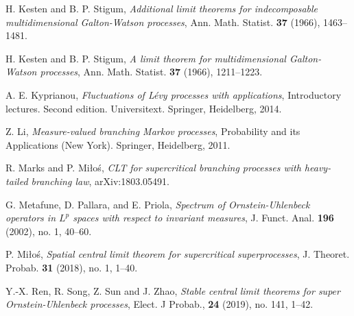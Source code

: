 \documentclass[12pt,a4paper]{amsart}
\theoremstyle{plain}
\theoremstyle{definition}
\numberwithin{equation}{section}
\begin{document}
\begin{thebibliography}{10}
  H. Kesten and B. P. Stigum,
  \emph{Additional limit theorems for indecomposable multidimensional {G}alton-{W}atson processes},
  Ann. Math. Statist. \textbf{37} (1966), 1463--1481.

  H. Kesten and B. P. Stigum,
  \emph{A limit theorem for multidimensional {G}alton-{W}atson processes},
  Ann. Math. Statist. \textbf{37} (1966), 1211--1223.

%
  A. E. Kyprianou,
  \emph{Fluctuations of {L}\'{e}vy processes with applications},
    Introductory lectures. Second edition. Universitext. Springer, Heidelberg, 2014.

  Z. Li,
  \emph{Measure-valued branching {M}arkov processes},
  Probability and its Applications (New York). Springer, Heidelberg, 2011.

%

  R. Marks and P. Mi{\l}o{\'s},
  \emph{C{LT} for supercritical branching processes with heavy-tailed branching law},
  arXiv:1803.05491.

  G. Metafune, D. Pallara, and E. Priola,
  \emph{Spectrum of {O}rnstein-{U}hlenbeck operators in {$L^p$} spaces with respect to invariant  measures},
  J. Funct. Anal. \textbf{196} (2002), no. 1, 40--60.

  P. Mi{\l}o{\'s},
  \emph{Spatial central limit theorem for supercritical superprocesses},
  J. Theoret. Probab. \textbf{31} (2018), no. 1, 1--40.

%
%
Y.-X. Ren, R. Song, Z. Sun and J. Zhao,
\emph{Stable central limit theorems for super Ornstein-Uhlenbeck processes},
Elect. J Probab., \textbf{24} (2019), no. 141, 1--42.


\end{thebibliography}
\end{document}
